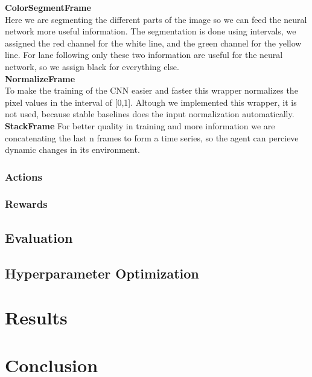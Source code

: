 \documentclass{article}
\begin{document}
\textbullet  \textbf{ColorSegmentFrame}\\
Here we are segmenting the different parts of the image so we can feed the neural network more useful information. The segmentation is done using intervals, we assigned the red channel for the white line, and the green channel for the yellow line. For lane following only these two information are useful for the neural network, so we assign black for everything else.\\
\textbullet  \textbf{NormalizeFrame}\\
To make the training of the CNN easier and faster this wrapper normalizes the pixel values in the interval of [0,1]. Altough we implemented this wrapper, it is not used, because stable baselines does the input normalization automatically.\\
\textbullet  \textbf{StackFrame}
For better quality in training and more information we are concatenating the last n frames to form a time series, so the agent can percieve dynamic changes in its environment.\\

\subsubsection{\normalsize{Actions}}

\subsubsection{\normalsize{Rewards}}

\subsection{\normalsize{Evaluation}}

\subsection{\normalsize{Hyperparameter Optimization}}

\section{\large{Results}}

\section{\large{Conclusion}}




\end{document}
